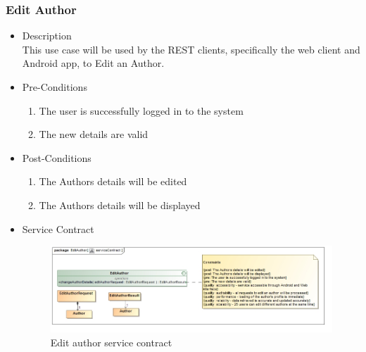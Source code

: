 \documentclass[a4paper,10pt]{article}
\begin{document}
\subsubsection{Edit Author}
	\begin{itemize}
		\item Description\\
		This use case will be used by the REST clients, specifically the web client and Android app, to Edit an Author.
		\item Pre-Conditions
		\begin{enumerate}
			\item The user is successfully logged in to the system
			\item The new details are valid
		\end{enumerate}
		\item Post-Conditions
		\begin{enumerate}
			\item The Authors details will be edited
			\item The Authors details will be displayed
			
		\end{enumerate}
		\item Service Contract
		\begin{figure}[H]
			\includegraphics[scale=0.5]{EditAuthorServiceContract}
			\caption{Edit author service contract}
		\end{figure}
	\end{itemize}
\end{document}
